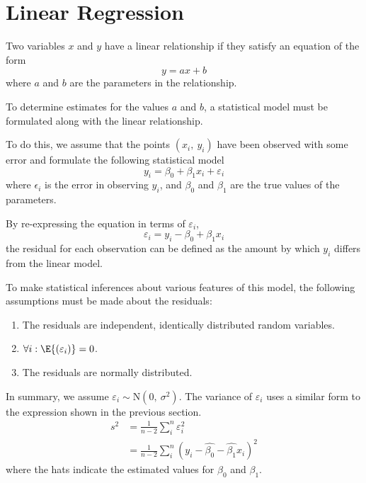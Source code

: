 \documentclass{article}
\begin{document}
\section{Linear Regression}
\begin{definition}
    Two variables $x$ and $y$ have a linear relationship if they satisfy an equation of the form
    \begin{equation*}
        y = a x + b
    \end{equation*}
    where $a$ and $b$ are the parameters in the relationship.
\end{definition}
To determine estimates for the values $a$ and $b$, a statistical model must be formulated along with the linear relationship.

To do this, we assume that the points $\left( x_i,\: y_i \right)$ have been observed with some error and formulate the following statistical model
\begin{equation*}
    y_i = \beta_0 + \beta_1 x_i + \varepsilon_i
\end{equation*}
where $\epsilon_i$ is the error in observing $y_i$, and $\beta_0$ and $\beta_1$ are the true values of the parameters.
\begin{definition}[Residual]
    By re-expressing the equation in terms of $\varepsilon_i$,
    \begin{equation*}
        \varepsilon_i = y_i - \beta_0 + \beta_1 x_i
    \end{equation*}
    the residual for each observation can be defined as the amount by which $y_i$ differs from the linear model.
\end{definition}
To make statistical inferences about various features of this model, the following assumptions must be made about the residuals:
\begin{enumerate}
    \item The residuals are independent, identically distributed random variables.
    \item $\forall i : \E{\left( \varepsilon_i \right)} = 0$.
    \item The residuals are normally distributed.
\end{enumerate}
In summary, we assume $\varepsilon_i \sim \mathrm{N}\left( 0,\: \sigma^2 \right)$.
The variance of $\varepsilon_i$ uses a similar form to the expression shown in the previous section.
\begin{align*}
    s^2 & = \frac{1}{n- 2} \sum_i^n \varepsilon_i^2                                          \\
        & = \frac{1}{n- 2} \sum_i^n \left( y_i - \hat{\beta_0} - \hat{\beta_1} x_i \right)^2
\end{align*}
where the hats indicate the estimated values for $\beta_0$ and $\beta_1$.
\end{document}
